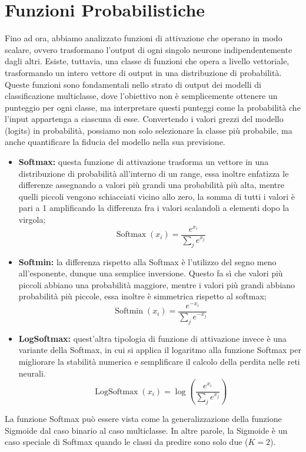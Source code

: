 \section{Funzioni Probabilistiche}
Fino ad ora, abbiamo analizzato funzioni di attivazione che operano in modo scalare, ovvero trasformano l'output di ogni singolo neurone indipendentemente dagli altri. Esiste, tuttavia, una classe di funzioni che opera a livello vettoriale, trasformando un intero vettore di output in una distribuzione di probabilità. Queste funzioni sono fondamentali nello strato di output dei modelli di classificazione multiclasse, dove l'obiettivo non è semplicemente ottenere un punteggio per ogni classe, ma interpretare questi punteggi come la probabilità che l'input appartenga a ciascuna di esse. Convertendo i valori grezzi del modello (logits) in probabilità, possiamo non solo selezionare la classe più probabile, ma anche quantificare la fiducia del modello nella sua previsione.

\begin{itemize}
    \item \textbf{Softmax:} questa funzione di attivazione trasforma un vettore in una distribuzione di probabilità all'interno di un range, essa inoltre enfatizza le differenze assegnando a valori più grandi una probabilità più alta, mentre quelli piccoli vengono schiacciati vicino allo zero, la somma di tutti i valori è pari a 1 amplificando la differenza fra i valori scalandoli a elementi dopo la virgola;
    \begin{equation}
        \operatorname{Softmax}(x_i) = \frac{e^{x_i}}{\sum_je^{x_j}}
    \end{equation}
    \item \textbf{Softmin:} la differenza rispetto alla Softmax è l'utilizzo del segno meno all'esponente, dunque una semplice inversione. Questo fa sì che valori più piccoli abbiano una probabilità maggiore, mentre i valori più grandi abbiano probabilità più piccole, essa inoltre è simmetrica rispetto al softmax;
    \begin{equation}
        \operatorname{Softmin}(x_i) = \frac{e^{-x_i}}{\sum_je^{-x_j}}
    \end{equation}
    \item \textbf{LogSoftmax:} quest'altra tipologia di funzione di attivazione invece è una variante della Softmax, in cui si applica il logaritmo alla funzione Softmax per migliorare la stabilità numerica e semplificare il calcolo della perdita nelle reti neurali.
    \begin{equation}
        \operatorname{LogSoftmax}(x_i) =\log( \frac{e^{x_i}}{\sum_je^{x_j}})
    \end{equation}
\end{itemize}

\begin{Osservazione}
    La funzione Softmax può essere vista come la generalizzazione della funzione Sigmoide dal caso binario al caso multiclasse. In altre parole, la Sigmoide è un caso speciale di Softmax quando le classi da predire sono solo due ($K=2$).
\end{Osservazione}
